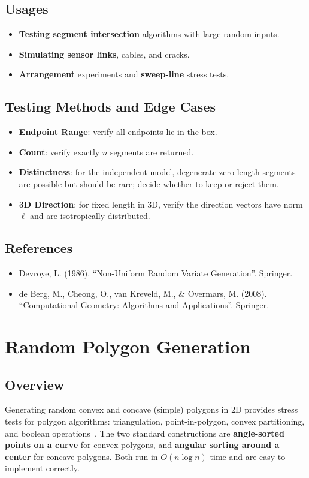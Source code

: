 \subsection{Usages}
\begin{itemize}
    \item \textbf{Testing segment intersection} algorithms with large random
      inputs.
    \item \textbf{Simulating sensor links}, cables, and cracks.
    \item \textbf{Arrangement} experiments and \textbf{sweep-line} stress
      tests.
\end{itemize}

\subsection{Testing Methods and Edge Cases}
\begin{itemize}
    \item \textbf{Endpoint Range}: verify all endpoints lie in the box.
    \item \textbf{Count}: verify exactly $n$ segments are returned.
    \item \textbf{Distinctness}: for the independent model, degenerate
      zero-length segments are possible but should be rare; decide whether to
      keep or reject them.
    \item \textbf{3D Direction}: for fixed length in 3D, verify the direction
      vectors have norm $\ell$ and are isotropically distributed.
\end{itemize}

\subsection{References}
\begin{itemize}
    \item Devroye, L. (1986). ``Non-Uniform Random Variate Generation''.
      Springer.
    \item de Berg, M., Cheong, O., van Kreveld, M., \& Overmars, M. (2008).
      ``Computational Geometry: Algorithms and Applications''. Springer.
\end{itemize}

\section{Random Polygon Generation}
\label{sec:random_polygons}

\subsection{Overview}
Generating random convex and concave
(simple) polygons in 2D provides stress tests for polygon algorithms:
triangulation, point-in-polygon, convex partitioning, and boolean
operations~\cite{deberg2008}. The two standard constructions are
\textbf{angle-sorted points on a curve} for convex polygons, and
\textbf{angular sorting around a center} for concave polygons. Both run in
$O(n \log n)$ time and are easy to implement correctly.

